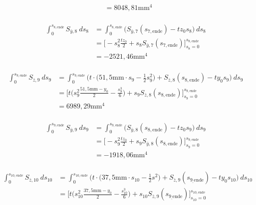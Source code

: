 \begin{itemize}
\begin{equation}
\begin{split}
			&=8048,81\mathrm{mm}^4
		\end{split}
	\end{equation}\\
	\begin{equation}
		\begin{split}
			\int_{0}^{s_{8,\mathrm{ende}}} S_{\bar y,8}\ ds_8 &= \int_{0}^{s_{8,\mathrm{ende}}} \bigg(S_{\bar y,7}(s_{7,\mathrm{ende}})-tz_0s_8\bigg)\ ds_8\\\
			&=\bigg[-s_8^2\frac{tz_0}{2}+s_8S_{\bar y,7}(s_{7,\mathrm{ende}})\bigg]_{s_8=0}^{s_{8,\mathrm{ende}}}\\\
			&=-2521,46\mathrm{mm}^4
		\end{split}
	\end{equation}\\
	\begin{equation}
		\begin{split}
			\int_{0}^{s_{9,\mathrm{ende}}} S_{\bar z,9}\ ds_9 &= \int_{0}^{s_{9,\mathrm{ende}}} \bigg(t\cdot\bigg(51,5\mathrm{mm}\cdot s_9-\frac{1}{2}s^2_9\bigg) + S_{\bar z,8}(s_{8,\mathrm{ende}})-ty_0s_9\bigg)\ ds_9\\\
			&=\bigg[t\bigg(s_9^2\frac{51,5\mathrm{mm}-y_0}{2}-\frac{s_9^3}{6}\bigg)+s_9S_{\bar z,8}(s_{8,\mathrm{ende}})\bigg]_{s_9=0}^{s_{9,\mathrm{ende}}}\\\
			&=6989,29\mathrm{mm}^4
		\end{split}
	\end{equation}\\
	\begin{equation}
		\begin{split}
			\int_{0}^{s_{9,\mathrm{ende}}} S_{\bar y,9}\ ds_9 &= \int_{0}^{s_{9,\mathrm{ende}}} \bigg(S_{\bar y,8}(s_{8,\mathrm{ende}})-tz_0s_9\bigg)\ ds_9\\\
			&=\bigg[-s_9^2\frac{tz_0}{2}+s_9S_{\bar y,8}(s_{8,\mathrm{ende}})\bigg]_{s_9=0}^{s_{9,\mathrm{ende}}}\\\
			&=-1918,06\mathrm{mm}^4
		\end{split}
	\end{equation}\\
	\begin{equation}
		\begin{split}
			\int_{0}^{s_{10,\mathrm{ende}}} S_{\bar z,10}\ ds_{10} &= \int_{0}^{s_{10,\mathrm{ende}}} \bigg(t\cdot\bigg(37,5\mathrm{mm}\cdot s_{10} - \frac{1}{2}s^2\bigg) + S_{\bar z,9}(s_{9_,\mathrm{ende}})-ty_0s_{10}\bigg)\ ds_{10}\\\
			&=\bigg[t\bigg(s_{10}^2\frac{37,5\mathrm{mm}-y_0}{2}-\frac{s_{10}^3}{6}\bigg)+s_{10}S_{\bar z,9}(s_{9_,\mathrm{ende}})\bigg]_{s_{10}=0}^{s_{10,\mathrm{ende}}}\\\

\end{split}
\end{equation}
\end{itemize}
